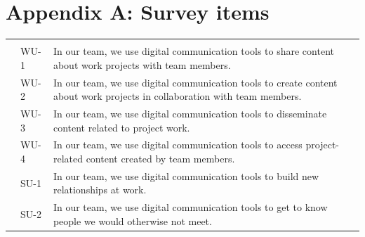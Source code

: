 \documentclass[10pt]{article}
\begin{document}
\section*{Appendix A: Survey items}

\renewcommand{\thetable}{A}

{\small{}%
\begin{longtable}{>{\raggedright\arraybackslash}p{2.5cm}l>{\raggedright\arraybackslash}p{\dimexpr\linewidth-2.5cm-1.5cm-1.0cm-6\tabcolsep\relax}>{\centering\arraybackslash}p{1.0cm}}
\caption{Measurement items}\label{tab:survey_items_app}\\
\toprule
\textbf{Constructs} & \textbf{Items} & \textbf{Measures} & \textbf{SFL} \\
\midrule
\endfirsthead
\multicolumn{4}{c}{\tablename~\thetable~(\textit{continued})} \\[3pt]
\toprule
\textbf{Constructs} & \textbf{Items} & \textbf{Measures} & \textbf{SFL} \\
\midrule
\endhead
\midrule
\multicolumn{4}{r}{\small\textit{Continued on next page}} \\
\endfoot
\bottomrule
\multicolumn{4}{@{}p{\linewidth}@{}}{\small\textit{Note}: SFL = standardized factor loading. All items were measured on a five-point Likert scale ranging from 1 (``strongly disagree'') to 5 (``strongly agree''). Items were adapted to the construction project context. (R) denotes reverse-scored item.} \\
\endlastfoot
\multirow{4}{2.5cm}{Work-oriented (WU)}
 & WU-1 & In our team, we use digital communication tools to share content about work projects with team members. & 0.831 \\
 & WU-2 & In our team, we use digital communication tools to create content about work projects in collaboration with team members. & 0.765 \\
 & WU-3 & In our team, we use digital communication tools to disseminate content related to project work. & 0.716 \\
 & WU-4 & In our team, we use digital communication tools to access project-related content created by team members. & 0.789 \\
\midrule
\multirow{4}{2.5cm}{Social-oriented (SU)}
 & SU-1 & In our team, we use digital communication tools to build new relationships at work. & 0.813 \\
 & SU-2 & In our team, we use digital communication tools to get to know people we would otherwise not meet. & 0.732 \\

\end{longtable}}
\end{document}
